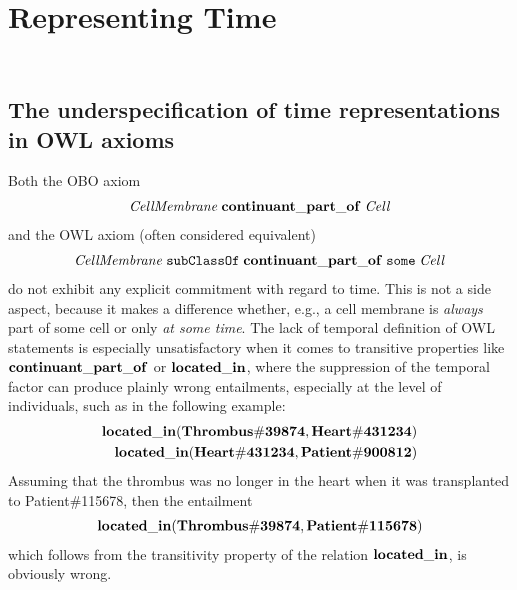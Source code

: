 \section*{Representing Time}


\subsection*{\\
The underspecification of time representations in OWL axioms}

Both the OBO axiom
%
\begin{equation}
\begin{split}
\mathit{CellMembrane}\;\mathrm{\mathbf{continuant\_part\_of}}\;\mathit{Cell}
\end{split}
\label{eq:cellobo}
\end{equation}
%
and the OWL axiom (often considered equivalent)
%
\begin{equation}
\begin{split}
\mathit{CellMembrane}\;\mathtt{subClassOf}\;\mathrm{\mathbf{continuant\_part\_of}}\;\mathtt{some}\;\mathit{Cell}
\end{split}
\label{eq:celldl}
\end{equation}
%
do not exhibit any explicit commitment with regard to time. This is not a side aspect, because it makes a
difference whether, e.g., a cell membrane is \emph{always} part of some cell or
only \emph{at some time}. 
The lack of temporal definition of OWL statements is especially unsatisfactory
when it comes to transitive properties like $\mathrm{\mathbf{continuant\_part\_of}}$ or $\mathrm{\mathbf{located\_in}}$,
where the suppression of the temporal factor can produce plainly wrong entailments,
especially at the level of individuals, such as in the following example:
%
\begin{equation}
\begin{split}
\mathrm{\mathbf{located\_in}} (\mathrm{\mathbf{Thrombus\#39874}}, \mathrm{\mathbf{Heart\#431234}})  \\
\mathrm{\mathbf{located\_in}} (\mathrm{\mathbf{Heart\#431234}}, \mathrm{\mathbf{Patient\#900812}})
\end{split}
\label{eq:trans}
\end{equation}
%
Assuming that the thrombus was no longer in the heart when it was transplanted to Patient\#115678, then the entailment
%
\begin{equation}
\begin{split}
\mathrm{\mathbf{located\_in}} (\mathrm{\mathbf{Thrombus\#39874}}, \mathrm{\mathbf{Patient\#115678}})
\end{split}
\label{eq:transEntailment}
\end{equation}
%
which follows from the transitivity property of the relation $\mathrm{\mathbf{located\_in}}$, is obviously wrong.


